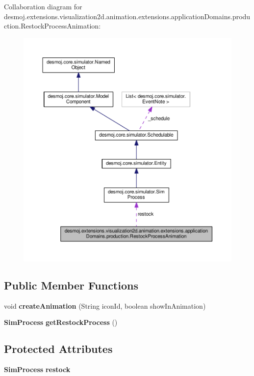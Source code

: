Collaboration diagram for desmoj.\-extensions.\-visualization2d.\-animation.\-extensions.\-application\-Domains.\-production.\-Restock\-Process\-Animation\-:
\nopagebreak
\begin{figure}[H]
\begin{center}
\leavevmode
\includegraphics[width=350pt]{classdesmoj_1_1extensions_1_1visualization2d_1_1animation_1_1extensions_1_1application_domains_13dc6600576ec620aef908525e2e61893}
\end{center}
\end{figure}
\subsection*{Public Member Functions}
\begin{DoxyCompactItemize}
\item 
void {\bf create\-Animation} (String icon\-Id, boolean show\-In\-Animation)
\item 
{\bf Sim\-Process} {\bfseries get\-Restock\-Process} ()\label{classdesmoj_1_1extensions_1_1visualization2d_1_1animation_1_1extensions_1_1application_domains_1780cda2aa858e2a82770a7fe39425cb2_adcb8e3246bb0faf7ce11af80c86ecac6}

\end{DoxyCompactItemize}
\subsection*{Protected Attributes}
\begin{DoxyCompactItemize}
\item 
{\bf Sim\-Process} {\bfseries restock}\label{classdesmoj_1_1extensions_1_1visualization2d_1_1animation_1_1extensions_1_1application_domains_1780cda2aa858e2a82770a7fe39425cb2_a5bc1cb7b40b3500d4fd29239b74fcd48}

\end{DoxyCompactItemize}


